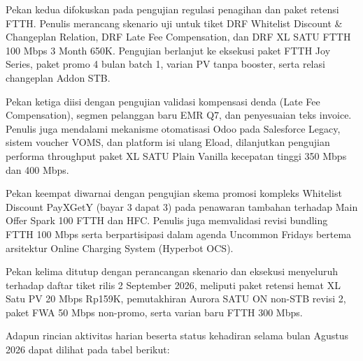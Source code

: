\documentclass[12pt,a4paper]{article}
\begin{document}
Pekan kedua difokuskan pada pengujian regulasi penagihan dan paket retensi FTTH. Penulis merancang skenario uji untuk tiket DRF Whitelist Discount \& Changeplan Relation, DRF Late Fee Compensation, dan DRF XL SATU FTTH 100 Mbps 3 Month 650K. Pengujian berlanjut ke eksekusi paket FTTH Joy Series, paket promo 4 bulan batch 1, varian PV tanpa booster, serta relasi changeplan Addon STB.

Pekan ketiga diisi dengan pengujian validasi kompensasi denda (Late Fee Compensation), segmen pelanggan baru EMR Q7, dan penyesuaian teks invoice. Penulis juga mendalami mekanisme otomatisasi Odoo pada Salesforce Legacy, sistem voucher VOMS, dan platform isi ulang Eload, dilanjutkan pengujian performa throughput paket XL SATU Plain Vanilla kecepatan tinggi 350 Mbps dan 400 Mbps.

Pekan keempat diwarnai dengan pengujian skema promosi kompleks Whitelist Discount PayXGetY (bayar 3 dapat 3) pada penawaran tambahan terhadap Main Offer Spark 100 FTTH dan HFC. Penulis juga memvalidasi revisi bundling FTTH 100 Mbps serta berpartisipasi dalam agenda Uncommon Fridays bertema arsitektur Online Charging System (Hyperbot OCS).

Pekan kelima ditutup dengan perancangan skenario dan eksekusi menyeluruh terhadap daftar tiket rilis 2 September 2026, meliputi paket retensi hemat XL Satu PV 20 Mbps Rp159K, pemutakhiran Aurora SATU ON non-STB revisi 2, paket FWA 50 Mbps non-promo, serta varian baru FTTH 300 Mbps.

\vspace{0.4cm}
\noindent Adapun rincian aktivitas harian beserta status kehadiran selama bulan Agustus 2026 dapat dilihat pada tabel berikut:
\end{document}
